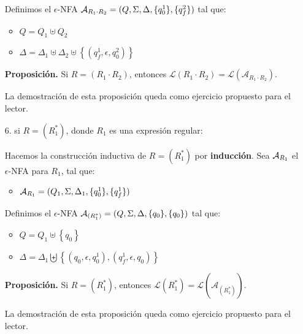 \begin{enumerate}
        Definimos el $\epsilon$-NFA $\mathcal{A}_{R_1 \cdot R_2} = (Q, \Sigma, \Delta, \{q_0^1\}, \{q_f^2\})$ tal que:
        \begin{itemize}
            \item $Q=Q_1 \uplus Q_2$
            \item $\Delta=\Delta_1 \uplus \Delta_2 \uplus\left\{\left(q_f^1, \epsilon, q_0^2\right)\right\}$
        \end{itemize}

        \textbf{Proposición.} Si $R = (R_1 \cdot R_2)$, entonces $\mathcal{L}\left(R_1\cdot R_2\right)=\mathcal{L}\left(\mathcal{A}_{R_1\cdot R_2}\right)$. \medbreak

        La demostración de esta proposición queda como ejercicio propuesto para el lector.

    \item[6.] si $R = (R_1^*)$, donde $R_1$ es una expresión regular:

        Hacemos la construcción inductiva de $R = (R_1^*)$ por \textbf{inducción}. Sea $\mathcal{A}_{R_1}$ el $\epsilon$-NFA para $R_1$, tal que:
        \begin{itemize}
            \item $\mathcal{A}_{R_1} = (Q_1, \Sigma, \Delta_1, \{q_0^1\}, \{q_f^1\})$
        \end{itemize}

        Definimos el $\epsilon$-NFA $\mathcal{A}_{(R_1^*)} = (Q, \Sigma, \Delta, \{q_0\}, \{q_0\})$ tal que:
        \begin{itemize}
            \item $Q=Q_1 \uplus\left\{q_0\right\}$
            \item $\Delta=\Delta_1 \biguplus\left\{\left(q_0, \epsilon, q_0^1\right),\left(q_f^1, \epsilon, q_0\right)\right\}$
        \end{itemize}

        \textbf{Proposición.} Si $R = (R_1^*)$, entonces $\mathcal{L}\left(R_1^*\right)=\mathcal{L}\left(\mathcal{A}_{(R_1^*)}\right)$. \medbreak

        La demostración de esta proposición queda como ejercicio propuesto para el lector.
\end{enumerate}


